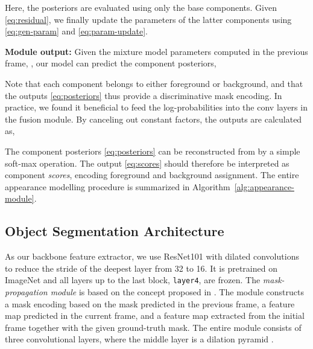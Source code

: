 \documentclass[10pt,twocolumn,letterpaper]{article}
\newcommand{\parsection}[1]{\noindent\textbf{#1:} }
\begin{document}
Here, the posteriors  are evaluated using only the base components. Given \eqref{eq:residual}, we finally update the parameters of the latter components  using \eqref{eq:gen-param} and \eqref{eq:param-update}.









































\parsection{Module output}
Given the mixture model parameters computed in the previous frame, , our model can predict the component posteriors,

Note that each component  belongs to either foreground or background, and that the outputs \eqref{eq:posteriors} thus provide a discriminative mask encoding. In practice, we found it beneficial to feed the log-probabilities  into the conv layers in the fusion module. By canceling out constant factors, the outputs are calculated as, 

The component posteriors \eqref{eq:posteriors} can be reconstructed from  by a simple soft-max operation. The output \eqref{eq:scores} should therefore be interpreted as component \emph{scores}, encoding foreground and background assignment. The entire appearance modelling procedure is summarized in Algorithm~\ref{alg:appearance-module}.

\subsection{Object Segmentation Architecture}
\label{sec:architecture}
As our backbone feature extractor, we use ResNet101 \cite{he2016deep} with dilated convolutions \cite{chen2018deeplab} to reduce the stride of the deepest layer from 32 to 16. It is pretrained on ImageNet and all layers up to the last block, \texttt{layer4}, are frozen. The \textit{mask-propagation module} is based on the concept proposed in \cite{RGMP}. The module constructs a mask encoding based on the mask predicted in the previous frame, a feature map predicted in the current frame, and a feature map extracted from the initial frame together with the given ground-truth mask. The entire module consists of three convolutional layers, where the middle layer is a dilation pyramid \cite{chen2018deeplab}.
\end{document}
